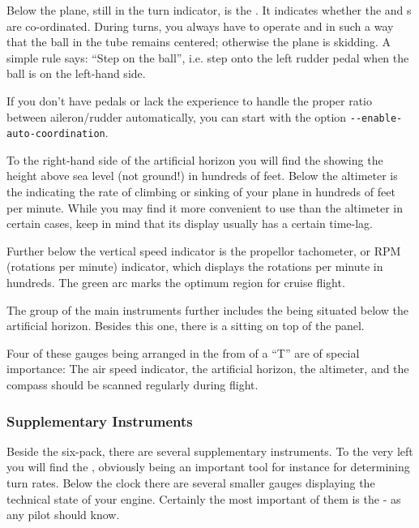 Below the plane, still in the turn indicator, is the . It
indicates whether the  and s are co-ordinated.
During turns, you always have to operate  and 
in such a way that the ball in the tube
remains centered; otherwise the plane is skidding. A simple rule says:
``Step on the ball'', i.e. step onto the left rudder pedal when
the ball is on the left-hand side.
\medskip

If you don't have pedals or lack the experience to handle the proper
ratio between aileron/rudder automatically, you can start \FlightGear{}
with the option \texttt{-$ $-enable-auto-coordination}.

To the right-hand side of the artificial horizon you will find the
 showing the height above sea level (not ground!) in hundreds
of feet.  Below the altimeter is the 
indicating the rate of climbing or sinking of your plane in hundreds of feet
per minute. While you may find it more convenient to use than the altimeter
in certain cases, keep in mind that its display usually has a certain time-lag.

Further below the vertical speed indicator is the propellor tachometer, or RPM
(rotations per minute) indicator, which displays the
rotations per minute in hundreds. The green arc marks the optimum region for
cruise flight.

The group of the main instruments further includes the 
being situated below the artificial horizon. Besides this one, there is a
 sitting on top of the panel.

Four of these gauges being arranged in the from of a ``T'' are of special
importance: The air speed indicator, the artificial horizon, the altimeter,
and the compass should be scanned regularly during flight.

\subsubsection{Supplementary Instruments}

Beside the six-pack, there are several supplementary instruments. To the very
left you will find the , obviously being an important tool
for instance for determining turn rates. Below the clock there are
several smaller gauges displaying the technical state of your engine.
Certainly the most important of them is the  - as
any pilot should know.

